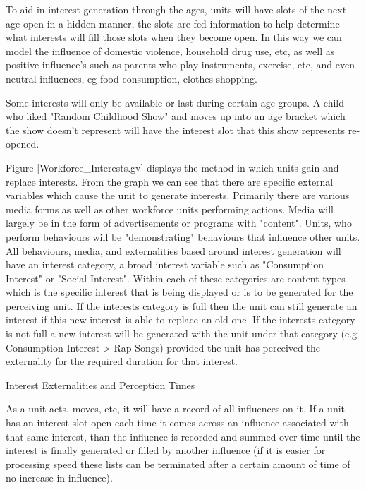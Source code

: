 To aid in interest generation through the ages, units will have slots of the next age open in a hidden manner, the slots are fed information to help determine what interests will fill those slots when they become open. In this way we can model the influence of domestic violence, household drug use, etc, as well as positive influence's such as parents who play instruments, exercise, etc, and even neutral influences, eg food consumption, clothes shopping.

Some interests will only be available or last during certain age groups. A child who liked "Random Childhood Show" and moves up into an age bracket which the show doesn't represent will have the interest slot that this show represents re-opened. 

Figure [Workforce_Interests.gv] displays the method in which units gain and replace interests. From the graph we can see that there are specific external variables which cause the unit to generate interests. Primarily there are various media forms as well as other workforce units performing actions. Media will largely be in the form of advertisements or programs with "content". Units, who perform behaviours will be "demonstrating" behaviours that influence other units. All behaviours, media, and externalities based around interest generation will have an interest category, a broad interest variable such as "Consumption Interest" or "Social Interest". Within each of these categories are content types which is the specific interest that is being displayed or is to be generated for the perceiving unit. If the interests category is full then the unit can still generate an interest if this new interest is able to replace an old one. If the interests category is not full a new interest will be generated with the unit under that category (e.g Consumption Interest > Rap Songs) provided the unit has perceived the externality for the required duration for that interest.

Interest Externalities and Perception Times



As a unit acts, moves, etc, it will have a record of all influences on it. If a unit has an interest slot open each time it comes across an influence associated with that same interest, than the influence is recorded and summed over time until the interest is finally generated or filled by another influence (if it is easier for processing speed these lists can be terminated after a certain amount of time of no increase in influence).

